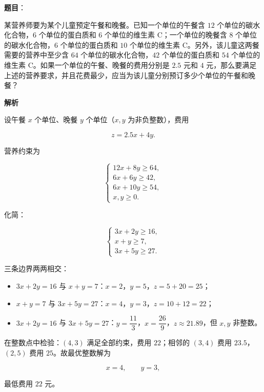 \begin{answer}

\textbf{题目}：

某营养师要为某个儿童预定午餐和晚餐。已知一个单位的午餐含 $12$ 个单位的碳水化合物，$6$ 个单位的蛋白质和 $6$ 个单位的维生素 C；一个单位的晚餐含 $8$ 个单位的碳水化合物，$6$ 个单位的蛋白质和 $10$ 个单位的维生素 C。另外，该儿童这两餐需要的营养中至少含 $64$ 个单位的碳水化合物，$42$ 个单位的蛋白质和 $54$ 个单位的维生素 C。如果一个单位的午餐、晚餐的费用分别是 $2.5$ 元和 $4$ 元，那么要满足上述的营养要求，并且花费最少，应当为该儿童分别预订多少个单位的午餐和晚餐？

\textbf{解析}

设午餐 $x$ 个单位、晚餐 $y$ 个单位（$x,y$ 为非负整数），费用

\nopagebreak[4]
\[z=2.5x+4y.\]

营养约束为

\nopagebreak[4]
\[\begin{cases}
12x+8y\geqslant64,\\
6x+6y\geqslant42,\\
6x+10y\geqslant54,\\
x,y\geqslant0.
\end{cases}\]

化简：

\nopagebreak[4]
\[\begin{cases}
3x+2y\geqslant16,\\
x+y\geqslant7,\\
3x+5y\geqslant27.
\end{cases}\]

三条边界两两相交：

\begin{itemize}
\item $3x+2y=16$ 与 $x+y=7$：$x=2$，$y=5$，$z=5+20=25$；
\item $x+y=7$ 与 $3x+5y=27$：$x=4$，$y=3$，$z=10+12=22$；
\item $3x+2y=16$ 与 $3x+5y=27$：$y=\dfrac{11}3$，$x=\dfrac{26}9$，$z\approx21.89$，但 $x,y$ 非整数。
\end{itemize}

在整数点中检验：$(4,3)$ 满足全部约束，费用 $22$；相邻的 $(3,4)$ 费用 $23.5$，$(2,5)$ 费用 $25$。故最优整数解为

\nopagebreak[4]
\[x=4,\qquad y=3,\]

最低费用 $22$ 元。


\end{answer}
